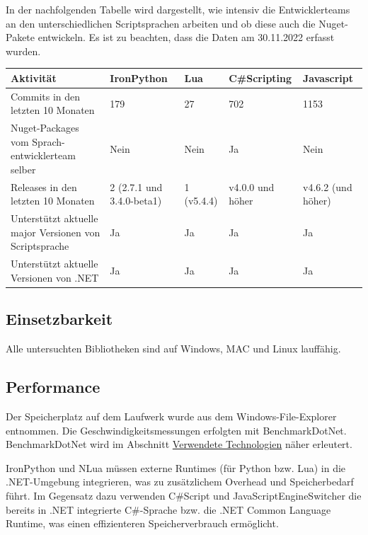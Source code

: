 In der nachfolgenden Tabelle wird dargestellt, wie intensiv die Entwicklerteams an den unterschiedlichen Scriptsprachen arbeiten und ob diese auch die Nuget-Pakete entwickeln.
Es ist zu beachten, dass die Daten am 30.11.2022 erfasst wurden.
\begin{table}[H]
    \begin{tabular}{|p{3cm}|p{3cm}|p{3cm}|p{3cm}|p{3cm}|}
        \hline
        Aktivität & IronPython & Lua & C\#Scripting & Javascript\\ \hline
        Commits in den letzten 10 Monaten & 179 & 27 & 702 & 1153 \\ \hline
        Nuget-Packages vom Sprach-entwicklerteam selber &Nein &Nein &Ja & Nein\\ \hline
        Releases in den letzten 10 Monaten & 2 (2.7.1 und 3.4.0-beta1) & 1 (v5.4.4) & v4.0.0 und höher & v4.6.2 (und höher)\\ \hline
        Unterstützt aktuelle major Versionen von Scriptsprache & Ja & Ja & Ja & Ja\\ \hline
        Unterstützt aktuelle Versionen von .NET & Ja & Ja & Ja & Ja \\ \hline
    \end{tabular}
\end{table}

\subsection{Einsetzbarkeit}
Alle untersuchten Bibliotheken sind auf Windows, MAC und Linux lauffähig.

\newpage
\subsection{Performance}
Der Speicherplatz auf dem Laufwerk wurde aus dem Windows-File-Explorer entnommen. 
Die Geschwindigkeitsmessungen erfolgten mit BenchmarkDotNet. 
BenchmarkDotNet wird im Abschnitt \hyperref[sec:tech]{Verwendete Technologien} näher erleutert.

IronPython und NLua müssen externe Runtimes (für Python bzw. Lua) in die .NET-Umgebung integrieren, was zu zusätzlichem Overhead und Speicherbedarf führt. 
Im Gegensatz dazu verwenden C\#Script und JavaScriptEngineSwitcher die bereits in .NET integrierte C\#-Sprache bzw. die .NET Common Language Runtime, was einen effizienteren Speicherverbrauch ermöglicht.
 
